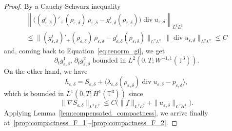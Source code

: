 \documentclass[JEP,XML,SOM,Unicode,NoEqCountersInSection]{cedram}
\newcommand{\<}{\bigl\langle}
\renewcommand{\>}{\bigr\rangle}
\theoremstyle{definition}
\theoremstyle{remark}
\newcommand{\TT}{\mathbb{T}^3}
\DeclareMathOperator{\Div}{div}
\let\ep\varepsilon
\begin{document}
\begin{proof}
By a Cauchy-Schwarz inequality
\begin{multline*}
\left\|\bigl((g_{\ep,\delta}^i)'_+(\rho_{\ep,\delta}) \, \rho_{\ep,\delta}-g_{\ep,\delta}^i(\rho_{\ep,\delta}) \bigr) \Div u_{\ep,\delta} \right\|_{L^1L^1} \\
\leq \|(g_{\ep,\delta}^i)'_+(\rho_{\ep,\delta}) \, \rho_{\ep,\delta}-g_{\ep,\delta}^i(\rho_{\ep,\delta}) \|_{L^2L^2}\, \|{\Div u_{\ep,\delta}}\|_{L^2L^2} \leq C
\end{multline*}
and, coming back to Equation~\eqref{eq:renorm_gi}, we get
\begin{equation*}
\partial_t g_{\ep,\delta}^1, \, \partial_t g_{\ep,\delta}^2 \text{ bounded in } L^2(0,T;W^{-1,1}(\TT)).
\end{equation*}
On the other hand, we have
\[
h_{\ep,\delta} = S_{\ep,\delta} + \<\lambda_{\ep,\delta}(\rho_{\ep,\delta})\Div u_{\ep,\delta} - p_{\ep,\delta}\>,
\]
which is bounded in $L^1(0,T;H^1(\TT))$ since
\[
\|\nabla S_{\ep,\delta}\|_{L^2L^2} \leq C \big(\|f\|_{L^2L^{\bar{q}}}+ \|u_{\ep,\delta}\|_{L^2H^1}\big).
\]
Applying Lemma~\ref{lem:compensated_compactness}, we arrive finally at~\eqref{prop:compactness_F_1}--\eqref{prop:compactness_F_2}.
\end{proof}
\end{document}
